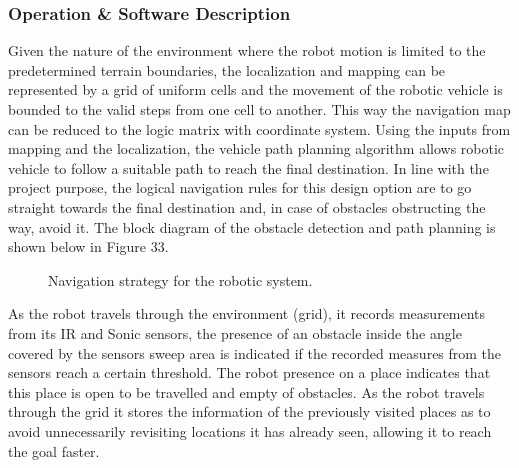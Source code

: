 \documentclass[a4paper]{article}
\begin{document}
\subsubsection{Operation \& Software Description}
Given the nature of the environment where the robot motion is limited to the predetermined terrain boundaries, the localization and mapping can be represented by a grid of uniform cells and the movement of the robotic vehicle is bounded to the valid steps from one cell to another. This way the navigation map can be reduced to the logic matrix with coordinate system. Using the inputs from mapping and the localization, the vehicle path planning algorithm allows robotic vehicle to follow a suitable path to reach the final destination. In line with the project purpose, the logical navigation rules for this design option are to go straight towards the final destination and, in case of obstacles obstructing the way, avoid it. The block diagram of the obstacle detection and path planning is shown below in Figure 33.\\

\begin{figure}[h]
\centering
{}
\caption{Navigation strategy for the robotic system.}
\end{figure}

As the robot travels through the environment (grid), it records measurements from its IR and Sonic sensors, the presence of an obstacle inside the angle covered by the sensors sweep area is indicated if the recorded measures from the sensors reach a certain threshold. The robot presence on a place indicates that this place is open to be travelled and empty of obstacles. As the robot travels through the grid it stores the information of the previously visited places as to avoid unnecessarily revisiting locations it has already seen, allowing it to reach the goal faster.\\
\end{document}

